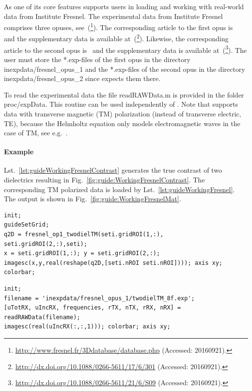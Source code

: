 \documentclass[a4paper]{article}
\begin{document}
As one of its core features \IPscatt supports users in loading and working with real-world data from Institute Fresnel. The experimental data from Institute Fresnel comprises three opuses, see~(\footnote{\url{http://www.fresnel.fr/3Ddatabase/database.php} (Accessed: 20160921).}). 
The corresponding article to the first opus is~\cite{Belkebir2001} and the supplementary data is available at~(\footnote{\url{http://dx.doi.org/10.1088/0266-5611/17/6/301} (Accessed: 20160921).}). Likewise, the corresponding article to the second opus is~\cite{Geffrin2005} and the supplementary data is available at~(\footnote{\url{http://dx.doi.org/10.1088/0266-5611/21/6/S09} (Accessed: 20160921).}). The user must store the \textsf{*.exp}-files of the first opus in the directory \textsf{inexpdata/fresnel\_opus\_1} and the \textsf{*.exp}-files of the second opus in the directory \textsf{inexpdata/fresnel\_opus\_2} since \IPscatt expects them there.

To read the experimental data the file \textsf{readRAWData.m} is provided in the folder \textsf{proc/expData}. This routine can be used independently of \IPscatt. Note that \IPscatt supports data with transverse magnetic (TM) polarization (instead of transverse electric, TE), because the Helmholtz equation only models electromagnetic waves in the case of TM, see e.g.~\cite{Colton2013}.

\paragraph{Example} Lst.~\ref{lst:guideWorkingFresnelContrast} generates the true contrast of two dielectrics resulting in Fig.~\ref{fig:guide:WorkingFresnelContrast}. The corresponding TM polarized data is loaded by Lst.~\ref{lst:guideWorkingFresnel}. The output is shown in Fig.~\ref{fig:guide:WorkingFresnelMat}.

\begin{lstlisting}[caption={True contrast of two dielectrics (\emph{source code}: \textsf{guides/guideWorkingFresnelContrast.m}).},label=lst:guideWorkingFresnelContrast]
init;
guideSetGrid;
q2D = fresnel_op1_twodielTM(seti.gridROI(1,:), seti.gridROI(2,:),seti);
x = seti.gridROI(1,:); y = seti.gridROI(2,:);
imagesc(x,y,real(reshape(q2D,[seti.nROI seti.nROI]))); axis xy; colorbar;
\end{lstlisting}

\begin{lstlisting}[caption={Reading data from Institute Fresnel (\emph{source code}: \textsf{guides/guideWorkingFresnel.m}).},label=lst:guideWorkingFresnel]
init;
filename = 'inexpdata/fresnel_opus_1/twodielTM_8f.exp';
[uTotRX, uIncRX, frequencies, rTX, nTX, rRX, nRX] = readRAWData(filename);
imagesc(real(uIncRX(:,:,1))); colorbar; axis xy;
\end{lstlisting}
\end{document}
